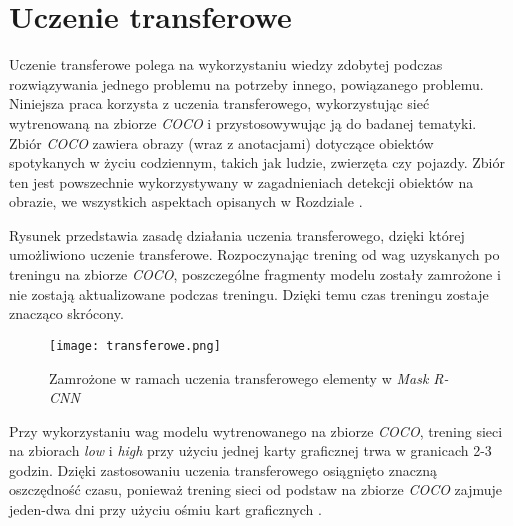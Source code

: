 \newpage
\section{Uczenie transferowe}
\label{sec:uczenie-transferowe}

Uczenie transferowe polega na wykorzystaniu wiedzy zdobytej podczas rozwiązywania jednego problemu na potrzeby innego, powiązanego problemu.
Niniejsza praca korzysta z uczenia transferowego, wykorzystując sieć wytrenowaną na zbiorze \textit{COCO} \cite{coco} i przystosowywując ją do badanej tematyki.
Zbiór \textit{COCO} zawiera obrazy (wraz z anotacjami) dotyczące obiektów spotykanych w życiu codziennym, takich jak ludzie, zwierzęta czy pojazdy. Zbiór ten jest powszechnie wykorzystywany w zagadnieniach detekcji obiektów na obrazie, we wszystkich aspektach opisanych w Rozdziale .

Rysunek  przedstawia zasadę działania uczenia transferowego, dzięki której umożliwiono uczenie transferowe. Rozpoczynając trening od wag uzyskanych po treningu na zbiorze \textit{COCO}, poszczególne fragmenty modelu zostały zamrożone i nie zostają aktualizowane podczas treningu. Dzięki temu czas treningu zostaje znacząco skrócony.

\begin{figure}[h]
  \centering
  \texttt{[image: transferowe.png]}
  \caption{Zamrożone w ramach uczenia transferowego elementy w \textit{Mask R-CNN}}
  \label{fig:transferowe}
\end{figure}

Przy wykorzystaniu wag modelu wytrenowanego na zbiorze \textit{COCO}, trening sieci na zbiorach \textit{low} i \textit{high} przy użyciu jednej karty graficznej trwa w granicach 2-3 godzin. Dzięki zastosowaniu uczenia transferowego osiągnięto znaczną oszczędność czasu, ponieważ trening sieci od podstaw na zbiorze \textit{COCO} zajmuje jeden-dwa dni przy użyciu ośmiu kart graficznych \cite{general-mask-rcnn}.

